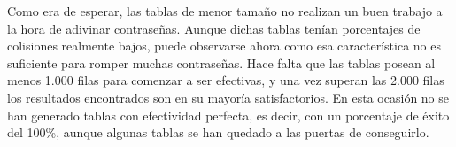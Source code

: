 \documentclass[12pt,spanish,listoffigures,listoftables]{tfgetsinf}
\begin{document}
\def\arraystretch{1.5}
\begin{table}[H]
	\centering
	\caption{Porcentajes de éxito para las tablas que emplean \textbf{R1}}
	\label{exR1}
\end{table}

Como era de esperar, las tablas de menor tamaño no realizan un buen trabajo a la hora de adivinar contraseñas. Aunque dichas tablas tenían porcentajes de colisiones realmente bajos, puede observarse ahora como esa característica no es suficiente para romper muchas contraseñas. Hace falta que las tablas posean al menos 1.000 filas para comenzar a ser efectivas, y una vez superan las 2.000 filas los resultados encontrados son en su mayoría satisfactorios. En esta ocasión no se han generado tablas con efectividad perfecta, es decir, con un porcentaje de éxito del 100\%, aunque algunas tablas se han quedado a las puertas de conseguirlo.
\end{document}
